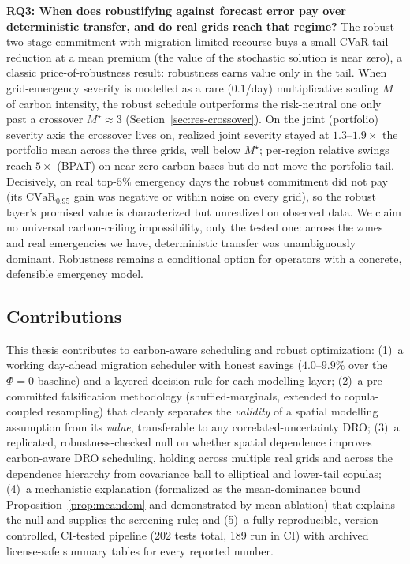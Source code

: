 \documentclass[10pt,twocolumn]{article}
\newcommand{\CVaR}{\mathrm{CVaR}}
\begin{document}
\textbf{RQ3: When does robustifying against forecast error pay over deterministic
transfer, and do real grids reach that regime?} The robust two-stage commitment with
migration-limited recourse buys a small CVaR tail reduction at a mean premium (the
value of the stochastic solution is near zero), a classic price-of-robustness result:
robustness earns value only in the tail. When grid-emergency severity is modelled as a
rare ($0.1$/day) multiplicative scaling $M$ of carbon intensity, the robust schedule
outperforms the risk-neutral one only past a crossover $M^\star\approx3$
(Section~\ref{sec:res-crossover}). On the joint (portfolio) severity axis the crossover
lives on, realized joint severity stayed at $1.3$--$1.9\times$ the portfolio mean across
the three grids, well below $M^\star$; per-region relative swings reach $5\times$ (BPAT)
on near-zero carbon bases but do not move the portfolio tail. Decisively, on real
top-$5\%$ emergency days the robust commitment did not pay (its $\CVaR_{0.95}$ gain was
negative or within noise on every grid), so the robust layer's promised value is
characterized but unrealized on observed data. We claim no universal carbon-ceiling
impossibility, only the tested one: across the zones and real emergencies we have,
deterministic transfer was unambiguously dominant. Robustness remains a conditional
option for operators with a concrete, defensible emergency model.

\subsection{Contributions}
This thesis contributes to carbon-aware scheduling and robust optimization: (1)~a
working day-ahead migration scheduler with honest savings ($4.0$--$9.9\%$ over the
$\Phi=0$ baseline) and a layered decision rule for each modelling layer; (2)~a
pre-committed falsification methodology (shuffled-marginals, extended to
copula-coupled resampling) that cleanly separates the \emph{validity} of a spatial
modelling assumption from its \emph{value}, transferable to any correlated-uncertainty
DRO; (3)~a replicated, robustness-checked null on whether spatial dependence improves
carbon-aware DRO scheduling, holding across multiple real grids and across the
dependence hierarchy from covariance ball to elliptical and lower-tail copulas; (4)~a
mechanistic explanation (formalized as the mean-dominance bound Proposition~\ref{prop:meandom}
and demonstrated by mean-ablation) that explains the null and supplies the screening
rule; and (5)~a fully reproducible, version-controlled, CI-tested pipeline (202 tests total, 189 run in CI)
with archived license-safe summary tables for every reported number.
\end{document}
